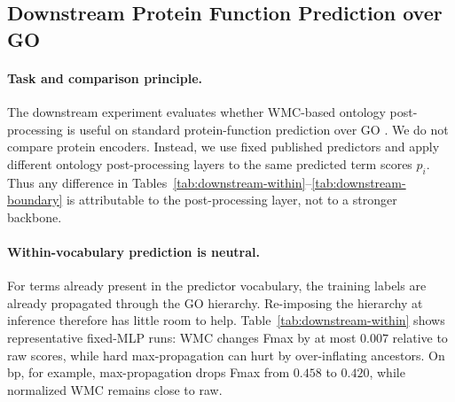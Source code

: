 \documentclass[letterpaper]{article}
\begin{document}
\begin{table}[t]\centering
\caption{Probabilistic inference routes on matched true-path tasks when applicable. \emph{Full GO} means running on complete GO namespaces, not only sampled subgraphs.}\label{tab:nesy}
\footnotesize
\setlength{\tabcolsep}{1.2pt}
\end{table}

\subsection{Downstream Protein Function Prediction over GO}\label{sec:downstream}
\paragraph{Task and comparison principle.}
The downstream experiment evaluates whether WMC-based ontology post-processing is useful on standard protein-function prediction over GO \citep{radivojac2013cafa,zhou2019cafa3}. We do not compare protein encoders. Instead, we use fixed published predictors and apply different ontology post-processing layers to the same predicted term scores $p_i$. Thus any difference in Tables~\ref{tab:downstream-within}--\ref{tab:downstream-boundary} is attributable to the post-processing layer, not to a stronger backbone.

\paragraph{Within-vocabulary prediction is neutral.}
For terms already present in the predictor vocabulary, the training labels are already propagated through the GO hierarchy. Re-imposing the hierarchy at inference therefore has little room to help. Table~\ref{tab:downstream-within} shows representative fixed-MLP runs: WMC changes Fmax by at most $0.007$ relative to raw scores, while hard max-propagation can hurt by over-inflating ancestors. On bp, for example, max-propagation drops Fmax from $0.458$ to $0.420$, while normalized WMC remains close to raw.
\end{document}
